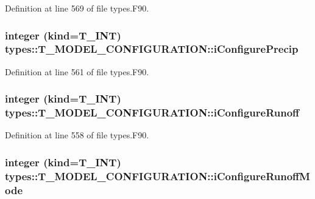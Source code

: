 Definition at line 569 of file types.F90.

\hypertarget{typetypes_1_1_t___m_o_d_e_l___c_o_n_f_i_g_u_r_a_t_i_o_n_a74e18adf0c62b1cc8e02c5152b8d769f}{
\subsubsection[{iConfigurePrecip}]{\setlength{\rightskip}{0pt plus 5cm}integer (kind={\bf T\_\-INT}) {\bf types::T\_\-MODEL\_\-CONFIGURATION::iConfigurePrecip}}}
\label{typetypes_1_1_t___m_o_d_e_l___c_o_n_f_i_g_u_r_a_t_i_o_n_a74e18adf0c62b1cc8e02c5152b8d769f}


Definition at line 561 of file types.F90.

\hypertarget{typetypes_1_1_t___m_o_d_e_l___c_o_n_f_i_g_u_r_a_t_i_o_n_ab71a98c2cc606a9be24f81804fb18adb}{
\subsubsection[{iConfigureRunoff}]{\setlength{\rightskip}{0pt plus 5cm}integer (kind={\bf T\_\-INT}) {\bf types::T\_\-MODEL\_\-CONFIGURATION::iConfigureRunoff}}}
\label{typetypes_1_1_t___m_o_d_e_l___c_o_n_f_i_g_u_r_a_t_i_o_n_ab71a98c2cc606a9be24f81804fb18adb}


Definition at line 558 of file types.F90.

\hypertarget{typetypes_1_1_t___m_o_d_e_l___c_o_n_f_i_g_u_r_a_t_i_o_n_a7d28fdb713cbf19fa0943ad73bbd0bda}{
\subsubsection[{iConfigureRunoffMode}]{\setlength{\rightskip}{0pt plus 5cm}integer (kind={\bf T\_\-INT}) {\bf types::T\_\-MODEL\_\-CONFIGURATION::iConfigureRunoffMode}}}
\label{typetypes_1_1_t___m_o_d_e_l___c_o_n_f_i_g_u_r_a_t_i_o_n_a7d28fdb713cbf19fa0943ad73bbd0bda}


